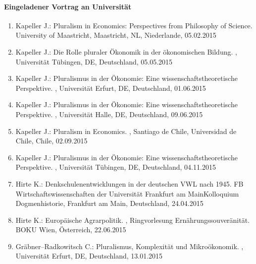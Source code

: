 \paragraph{Eingeladener Vortrag an Universität}
\begin{enumerate}
	\item Kapeller J.: Pluralism in Economics: Perspectives from Philosophy of Science. University of Maastricht, Maastricht, NL, Niederlande, 05.02.2015
	\item Kapeller J.: Die Rolle pluraler Ökonomik in der ökonomischen Bildung. , Universität Tübingen, DE, Deutschland, 05.05.2015
	\item Kapeller J.: Pluralismus in der Ökonomie: Eine wissenschaftstheoretische Perspektive. , Universität Erfurt, DE, Deutschland, 01.06.2015
	\item Kapeller J.: Pluralismus in der Ökonomie: Eine wissenschaftstheoretische Perspektive. , Universität Halle, DE, Deutschland, 09.06.2015
	\item Kapeller J.: Pluralism in Economics. , Santiago de Chile, Universidad de Chile, Chile, 02.09.2015
	\item Kapeller J.: Pluralismus in der Ökonomie: Eine wissenschaftstheoretische Perspektive. , Universität Tübingen, DE, Deutschland, 04.11.2015
	\item Hirte K.: Denkschulenentwicklungen in der deutschen VWL nach 1945. FB Wirtschaftswissenschaften der Universität Frankfurt am MainKolloquium Dogmenhistorie, Frankfurt am Main, Deutschland, 24.04.2015
	\item Hirte K.: Europäische Agrarpolitik. , Ringvorlesung Ernährungssouveränität. BOKU Wien, Österreich, 22.06.2015
	\item Gräbner--Radkowitsch C.: Pluralismus, Komplexität und Mikroökonomik. , Universität Erfurt, DE, Deutschland, 13.01.2015
\end{enumerate}
